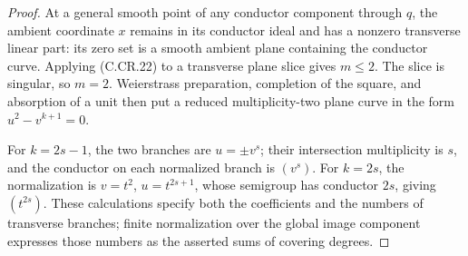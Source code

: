 \begin{proof}
At a general smooth point of any conductor
component through $q$, the ambient coordinate
$x$ remains in its conductor ideal and has
a nonzero transverse linear part: its zero
set is a smooth ambient plane containing the
conductor curve. Applying (C.CR.22) to a
transverse plane slice gives $m\le2$.
The slice is singular, so $m=2$.
Weierstrass preparation, completion of the
square, and absorption of a unit then put
a reduced multiplicity-two plane curve in
the form $u^2-v^{k+1}=0$.

For $k=2s-1$, the two branches are
$u=\pm v^s$; their intersection multiplicity
is $s$, and the conductor on each normalized
branch is $(v^s)$. For $k=2s$, the normalization
is $v=t^2$, $u=t^{2s+1}$, whose semigroup
has conductor $2s$, giving $(t^{2s})$.
These calculations specify both the coefficients
and the numbers of transverse branches; finite
normalization over the global image component
expresses those numbers as the asserted sums
of covering degrees.
\end{proof}




